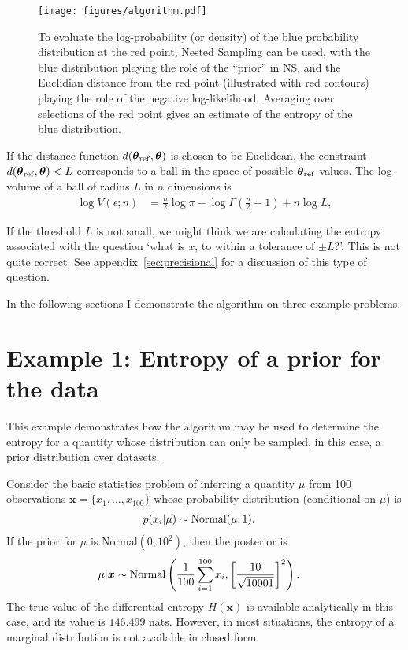 \documentclass[entropy,article,accept,oneauthor,pdftex,10pt,a4paper]{mdpi}
\newcommand{\x}{\boldsymbol{\theta}}
\newcommand{\xref}{\x_{\rm ref}}
\begin{document}
\begin{figure}[!ht]
\centering
\texttt{[image: figures/algorithm.pdf]}
\caption{To evaluate the log-probability (or density) of the blue
probability distribution at the red point, Nested Sampling can be used,
with the blue distribution playing the role of the ``prior'' in NS, and the
Euclidian distance from the red point (illustrated with red contours)
playing the role of the negative log-likelihood. Averaging over selections
of the red point gives an estimate of the entropy of the blue distribution.
\label{fig:algorithm}}
\end{figure}

If the distance function $d(\xref, \x)$ is chosen to be Euclidean,
the constraint $d(\xref, \x) < L$ corresponds to a ball in the space
of possible $\xref$ values.
The log-volume of a ball of radius $L$ in $n$ dimensions is
\begin{align}
\log V(\epsilon; n) &= \frac{n}{2}\log \pi
                        - \log \Gamma\left(\frac{n}{2} + 1\right)
                        + n \log L,
\end{align}

If the threshold $L$ is not small, we might think we are calculating the entropy associated
with the question `what is $x$, to within a tolerance of $\pm L$?'.
This is not quite correct. See appendix~\ref{sec:precisional}
for a discussion of this
type of question.

In the following sections I demonstrate the algorithm on three
example problems.

\section{Example 1: Entropy of a prior for the data}

This example demonstrates how the algorithm may be used to determine the
entropy for a quantity whose distribution can only be sampled, in this case,
a prior distribution over datasets.

Consider the basic statistics problem of inferring a quantity $\mu$ from
100 observations $\boldsymbol{x} = \{x_1, ..., x_{100}\}$ whose
probability distribution (conditional on $\mu$) is
\begin{align}
p(x_i | \mu) &\sim \textnormal{Normal}(\mu, 1).
\end{align}
If the prior for $\mu$ is Normal$(0, 10^2)$, then the posterior is
\begin{align}
\mu | \boldsymbol{x} &\sim \textnormal{Normal}\left(
                                       \frac{1}{100}\sum_{i=1}^{100} x_i,
                                       \left[\frac{10}{\sqrt{10001}}\right]^2
                                       \right).
\end{align}
The true value of the differential entropy $H(\boldsymbol{x})$ is
available analytically
in this case, and its value is $146.499$ nats. However, in most situations, the
entropy of a marginal distribution is not available in closed form. 
\end{document}
